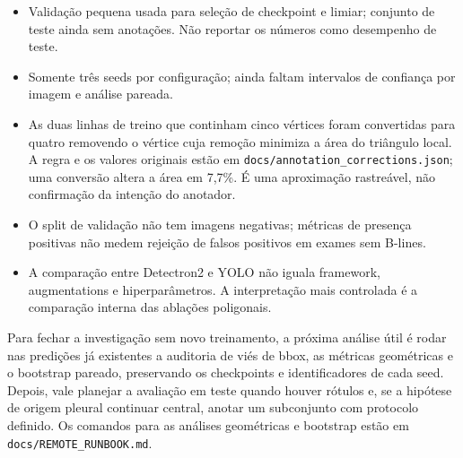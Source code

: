 \documentclass[10pt]{article}
\begin{document}
\begin{itemize}
  \item Validação pequena usada para seleção de checkpoint e limiar; conjunto de
  teste ainda sem anotações. Não reportar os números como desempenho de teste.
  \item Somente três seeds por configuração; ainda faltam intervalos de
  confiança por imagem e análise pareada.
  \item As duas linhas de treino que continham cinco vértices foram convertidas
  para quatro removendo o vértice cuja remoção minimiza a área do triângulo local.
  A regra e os valores originais estão em
  \texttt{docs/annotation\_corrections.json}; uma conversão altera a área em
  7,7\%. É uma aproximação rastreável, não confirmação da intenção do anotador.
  \item O split de validação não tem imagens negativas; métricas de presença
  positivas não medem rejeição de falsos positivos em exames sem B-lines.
  \item A comparação entre Detectron2 e YOLO não iguala framework, augmentations
  e hiperparâmetros. A interpretação mais controlada é a comparação interna das
  ablações poligonais.
\end{itemize}

Para fechar a investigação sem novo treinamento, a próxima análise útil é rodar
nas predições já existentes a auditoria de viés de bbox, as métricas geométricas
e o bootstrap pareado, preservando os checkpoints e identificadores de cada
seed. Depois, vale planejar a avaliação em teste quando houver rótulos e, se a
hipótese de origem pleural continuar central, anotar um subconjunto com protocolo
definido. Os comandos para as análises geométricas e bootstrap estão em
\texttt{docs/REMOTE\_RUNBOOK.md}.
\end{document}
